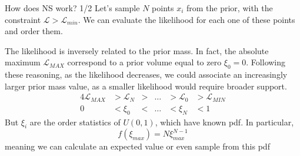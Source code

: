 \documentclass[
10pt,
aspectratio=169,
]{beamer}
\begin{document}
\begin{frame}{How does NS work? 1/2}
Let's sample $N$ points $x_i$ from the prior, with the constraint $\mathcal{L}>\mathcal{L}_{min}$. We can evaluate the likelihood for each one of these points and order them.

\vfill

The likelihood is inversely related to the prior mass. In fact, the absolute maximum $\mathcal{L}_{MAX}$ correspond to a prior volume equal to zero $\xi_0 = 0$. Following these reasoning, as the likelihood decreases, we could associate an increasingly larger prior mass value, as a smaller likelihood would require broader support.
    \begin{alignat*}{4}
        \mathcal{L}_{MAX} & > \mathcal{L}_N& > &\dots &> \mathcal{L}_0 &> \mathcal{L}_{MIN} \\
0 & < \xi_0 &< &\dots &< \xi_{N} &< 1
    \end{alignat*}
    But  $\xi_i$ are the order statistics of $U(0,1)$, which have known pdf. In particular, 
\begin{equation*}
    f(\xi_{max}) = N\xi_{max}^{N-1} 
\end{equation*}
meaning we can calculate an expected value or even sample from this pdf
\end{frame}
\end{document}
